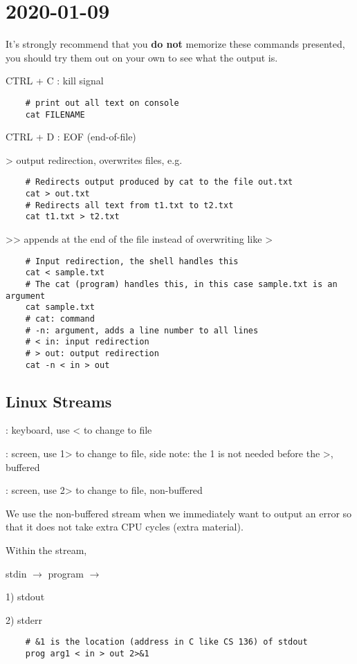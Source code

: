 \section{2020-01-09}
It's strongly recommend that you \textbf{do not} memorize these commands presented,
you should try them out on your own to see what the output is.

CTRL + C : kill signal
\begin{lstlisting}
    # print out all text on console
    cat FILENAME
\end{lstlisting}
CTRL + D : EOF (end-of-file)

> output redirection, overwrites files, e.g.
\begin{lstlisting}
    # Redirects output produced by cat to the file out.txt
    cat > out.txt
    # Redirects all text from t1.txt to t2.txt
    cat t1.txt > t2.txt
\end{lstlisting}
>{}> appends at the end of the file instead of overwriting like >
\begin{lstlisting}
    # Input redirection, the shell handles this
    cat < sample.txt
    # The cat (program) handles this, in this case sample.txt is an argument
    cat sample.txt
    # cat: command
    # -n: argument, adds a line number to all lines
    # < in: input redirection
    # > out: output redirection
    cat -n < in > out
\end{lstlisting}

\subsection{Linux Streams}

: keyboard, use < to change to file

: screen, use 1> to change to file,
side note: the 1 is not needed before the >, buffered

: screen, use 2> to change to file, non-buffered

We use the non-buffered stream when we immediately want to output an error
so that it does not take extra CPU cycles (extra material).

Within the stream,

stdin $ \rightarrow $ program $ \rightarrow $

1) stdout

2) stderr

\begin{lstlisting}
    # &1 is the location (address in C like CS 136) of stdout
    prog arg1 < in > out 2>&1
\end{lstlisting}

